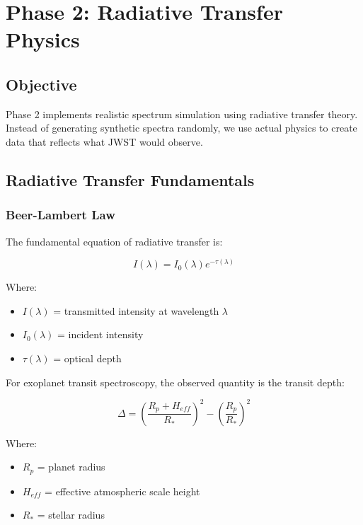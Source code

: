 \documentclass[12pt,a4paper,oneside]{report}
\begin{document}
\newpage
\chapter{Phase 2: Radiative Transfer Physics}

\section{Objective}

Phase 2 implements realistic spectrum simulation using radiative transfer theory. Instead of generating synthetic spectra randomly, we use actual physics to create data that reflects what JWST would observe.

\section{Radiative Transfer Fundamentals}

\subsection{Beer-Lambert Law}

The fundamental equation of radiative transfer is:

\begin{equation}
I(\lambda) = I_0(\lambda) e^{-\tau(\lambda)}
\label{eq:beer_lambert}
\end{equation}

Where:
\begin{itemize}
    \item $I(\lambda)$ = transmitted intensity at wavelength $\lambda$
    \item $I_0(\lambda)$ = incident intensity
    \item $\tau(\lambda)$ = optical depth
\end{itemize}

For exoplanet transit spectroscopy, the observed quantity is the transit depth:

\begin{equation}
\Delta = \left(\frac{R_p + H_{eff}}{R_*}\right)^2 - \left(\frac{R_p}{R_*}\right)^2
\label{eq:transit_depth}
\end{equation}

Where:
\begin{itemize}
    \item $R_p$ = planet radius
    \item $H_{eff}$ = effective atmospheric scale height
    \item $R_*$ = stellar radius
\end{itemize}
\end{document}
